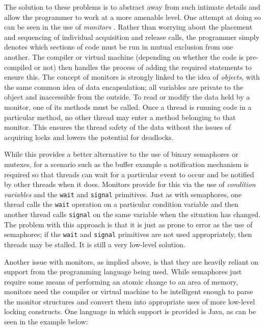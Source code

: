 The solution to these problems is to abstract away from such intimate
details and allow the programmer to work at a more amenable level.
One attempt at doing so can be seen in the use of \emph{monitors}
\cite{mon1,mon2}.  Rather than worrying about the placement and
sequencing of individual acquisition and release calls, the programmer
simply denotes which sections of code must be run in mutual exclusion
from one another.  The compiler or virtual machine (depending on
whether the code is pre-compiled or not) then handles the process of
adding the required statements to ensure this.  The concept of
monitors is strongly linked to the idea of \emph{objects}, with the
same common idea of data encapsulation; all variables are private to
the object and inaccessible from the outside.  To read or modify the
data held by a monitor, one of its methods must be called.  Once a
thread is running code in a particular method, no other thread may
enter a method belonging to that monitor.  This ensures the thread
safety of the data without the issues of acquiring locks and lowers
the potential for deadlocks.

While this provides a better alternative to the use of binary
semaphores or mutexes, for a scenario such as the buffer example a
notification mechanism is required so that threads can wait for a
particular event to occur and be notified by other threads when it
does.  Monitors provide for this via the use of \emph{condition
  variables} and the \texttt{wait} and \texttt{signal} primitives.
Just as with semaphores, one thread calls the \texttt{wait} operation
on a particular condition variable and then another thread calls
\texttt{signal} on the same variable when the situation has changed.
The problem with this approach is that it is just as prone to error as
the use of semaphores; if the \texttt{wait} and \texttt{signal}
primitives are not used appropriately, then threads may be stalled.
It is still a very low-level solution.

Another issue with monitors, as implied above, is that they are
heavily reliant on support from the programming language being used.
While semaphores just require some means of performing an atomic
change to an area of memory, monitors need the compiler or virtual
machine to be intelligent enough to parse the monitor structures and
convert them into appropriate uses of more low-level locking
constructs.  One language in which support is provided is Java, as can
be seen in the example below:

